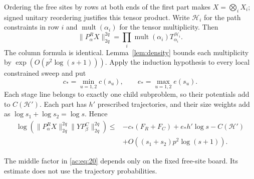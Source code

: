 Ordering the free sites by rows at both ends of the first part makes
\(X=\bigotimes_i X_i\); signed unitary reordering justifies this tensor
product. Write \(\mathcal H_i\) for the path constraints in row \(i\)
and \(\operatorname{mult}(\alpha_i)\) for the tensor multiplicity. Then
\[
 \|P_\alpha^R X\|_{2q}^{2q}
 =\prod_i \operatorname{mult}(\alpha_i)T_{\alpha_i}^{\mathcal H_i}.
\]
The column formula is identical. Lemma~\ref{lem:density} bounds each
multiplicity by \(\exp(O(p^2\log(s+1)))\). Apply the induction hypothesis
to every local constrained sweep and put
\[
 c_*=\min_{u=1,2}c(s_u),\qquad
 e_*=\max_{u=1,2}e(s_u).
\]
Each stage line belongs to exactly one child subproblem, so their
potentials add to \(C(\mathcal H')\). Each part has \(h'\) prescribed
trajectories, and their size weights add as
\(\log s_1+\log s_2=\log s\). Hence
\begin{equation}
\begin{aligned}
 \log\!\left(
 \|P_\alpha^R X\|_{2q}^{2q}\|Y P_\beta^C\|_{2q}^{2q}
 \right)
 \le{}&-c_*(F_R+F_C)+e_*h'\log s-C(\mathcal H')\\
 &+O((s_1+s_2)p^2\log(s+1)).
\end{aligned}
\label{ac:eq:18}
\end{equation}

The middle factor in \eqref{ac:eq:20} depends only on the fixed free-site
board. Its estimate does not use the trajectory probabilities.

